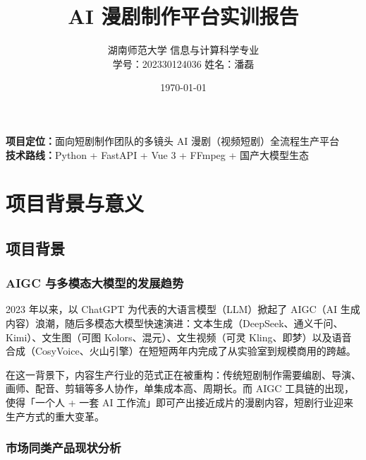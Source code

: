 \documentclass[12pt]{ctexrep}
\begin{document}
\title{\bfseries AI 漫剧制作平台实训报告}
\author{湖南师范大学 \quad 信息与计算科学专业\\
学号：202330124036 \quad 姓名：潘磊}
\date{\today}
\maketitle

\begin{center}
\begin{minipage}{0.9\textwidth}
\textbf{项目定位：}面向短剧制作团队的多镜头 AI 漫剧（视频短剧）全流程生产平台\\
\textbf{技术路线：}Python + FastAPI + Vue 3 + FFmpeg + 国产大模型生态
\end{minipage}
\end{center}

\tableofcontents

\chapter{项目背景与意义}
\section{项目背景}
\subsection{AIGC 与多模态大模型的发展趋势}

2023 年以来，以 ChatGPT 为代表的大语言模型（LLM）掀起了 AIGC（AI 生成内容）浪潮，随后多模态大模型快速演进：文本生成（DeepSeek、通义千问、Kimi）、文生图（可图 Kolors、混元）、文生视频（可灵 Kling、即梦）以及语音合成（CosyVoice、火山引擎）在短短两年内完成了从实验室到规模商用的跨越。

在这一背景下，内容生产行业的范式正在被重构：传统短剧制作需要编剧、导演、画师、配音、剪辑等多人协作，单集成本高、周期长。而 AIGC 工具链的出现，使得「一个人 + 一套 AI 工作流」即可产出接近成片的漫剧内容，短剧行业迎来生产方式的重大变革。

\subsection{市场同类产品现状分析}
\end{document}
